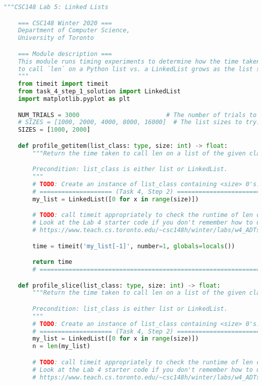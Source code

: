\documentclass[12pt]{article}
\begin{document}
\begin{mdframed}
    \begin{lstlisting}[language=python]
    """CSC148 Lab 5: Linked Lists

    === CSC148 Winter 2020 ===
    Department of Computer Science,
    University of Toronto

    === Module description ===
    This module runs timing experiments to determine how the time taken
    to call `len` on a Python list vs. a LinkedList grows as the list size grows.
    """
    from timeit import timeit
    from task_4_step_1_solution import LinkedList
    import matplotlib.pyplot as plt

    NUM_TRIALS = 3000                        # The number of trials to run.
    # SIZES = [1000, 2000, 4000, 8000, 16000]  # The list sizes to try.
    SIZES = [1000, 2000]

    def profile_getitem(list_class: type, size: int) -> float:
        """Return the time taken to call len on a list of the given class and size.

        Precondition: list_class is either list or LinkedList.
        """
        # TODO: Create an instance of list_class containing <size> 0's.
        # ==================== (Task 4, Step 2) =======================
        my_list = LinkedList([0 for x in range(size)])

        # TODO: call timeit appropriately to check the runtime of len on the list.
        # Look at the Lab 4 starter code if you don't remember how to use timeit:
        # https://www.teach.cs.toronto.edu/~csc148h/winter/labs/w4_ADTs/starter-code/timequeue.py

        time = timeit('my_list[-1]', number=1, globals=locals())

        return time
        # =================================================================

    def profile_slice(list_class: type, size: int) -> float:
        """Return the time taken to call len on a list of the given class and size.

        Precondition: list_class is either list or LinkedList.
        """
        # TODO: Create an instance of list_class containing <size> 0's.
        # ==================== (Task 4, Step 2) =======================
        my_list = LinkedList([0 for x in range(size)])
        n = len(my_list)

        # TODO: call timeit appropriately to check the runtime of len on the list.
        # Look at the Lab 4 starter code if you don't remember how to use timeit:
        # https://www.teach.cs.toronto.edu/~csc148h/winter/labs/w4_ADTs/starter-code/timequeue.py


\end{lstlisting}
\end{mdframed}
\end{document}
